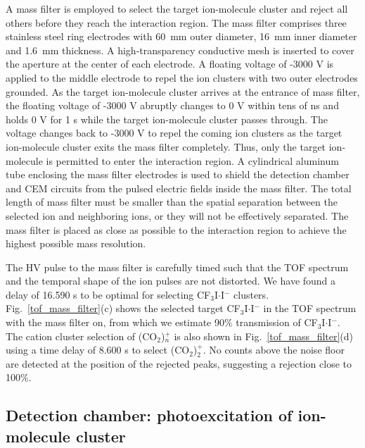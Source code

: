 \documentclass[%
aip,
rsi,
 amsmath,amssymb,
reprint,%
]{revtex4-1}
\begin{document}
A mass filter is employed to select the target ion-molecule cluster and reject all others before they reach the interaction region. The mass filter comprises three stainless steel ring electrodes with 60~mm outer diameter, 16~mm inner diameter and 1.6~mm thickness. A high-transparency conductive mesh is inserted to cover the aperture at the center of each electrode. A floating voltage of -3000 V is applied to the middle electrode to repel the ion clusters with two outer electrodes grounded. As the target ion-molecule cluster arrives at the entrance of mass filter, the floating voltage of -3000 V abruptly changes to 0 V within tens of ns and holds 0 V for 1 {\textmu}s while the target ion-molecule cluster passes through. The voltage changes back to -3000 V to repel the coming ion clusters as the target ion-molecule cluster exits the mass filter completely. Thus, only the target ion-molecule is permitted to enter the interaction region. A cylindrical aluminum  tube enclosing the mass filter electrodes is used to shield the detection chamber and CEM circuits from the pulsed electric fields inside the mass filter. The total length of mass filter must be smaller than the spatial separation between the selected ion and neighboring ions, or they will not be effectively separated. The mass filter is placed as close as possible to the interaction region to achieve the highest possible mass resolution. 

The HV pulse to the mass filter is carefully timed such that the TOF spectrum and the temporal shape of the ion pulses are not distorted. We have found a delay of 16.590 {\textmu}s to be optimal for selecting CF$_3$I$\cdot$I$^-$ clusters. Fig.~\ref{tof_mass_filter}(c) shows the selected target CF$_3$I$\cdot$I$^-$ in the TOF spectrum with the mass filter on, from which we estimate 90\% transmission of CF$_3$I$\cdot$I$^-$. The cation cluster selection of (CO$_2$)$_n^+$ is also shown in Fig.~\ref{tof_mass_filter}(d) using a time delay of 8.600 {\textmu}s to select (CO$_2$)$_2^+$. No counts above the noise floor are detected at the position of the rejected peaks, suggesting a rejection close to 100\%. 

\subsection{Detection chamber: photoexcitation of ion-molecule cluster}
\end{document}
